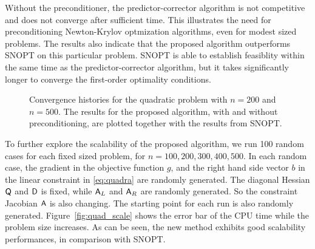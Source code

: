Without the preconditioner, the predictor-corrector algorithm is not competitive
and does not converge after sufficient time.  This illustrates the need for preconditioning Newton-Krylov
optmization algorithms, even for modest sized problems.  The results
also indicate that the proposed algorithm outperforms SNOPT on this particular
problem.  SNOPT is able to establish feasiblity within the same time as the
predictor-corrector algorithm, but it takes significantly longer to converge the
first-order optimality conditions.

\begin{figure}[tbp]
  \centering
   \hspace{1em}
   \caption{Convergence histories for the quadratic problem with $n=200$ and
  $n=500$. The results for the proposed algorithm, with and without
  preconditioning, are plotted together with the results from
  SNOPT.\label{fig:quad_hist}}
\end{figure}

To further explore the scalability of the proposed algorithm, we run 100 random cases for 
each fixed sized problem, for $n = 100, 200, 300, 400, 500$.  In each random case, the gradient 
in the objective function $g$, and the right hand side vector $b$ in the linear constraint in \eqref{eq:quadra} 
are randomly generated. The diagonal Hessian $\mathsf{Q}$ and $\mathsf{D}$ is fixed, while $\mathsf{A}_L$ and $\mathsf{A}_R$ are randomly generated. So the constraint Jacobian $\mathsf{A}$ is also changing. The starting point for each run is also randomly generated. Figure~\ref{fig:quad_scale} shows the error bar of the CPU time while
the problem size increases. As can be seen, the new method exhibits good scalability performances, in comparison with SNOPT. 

